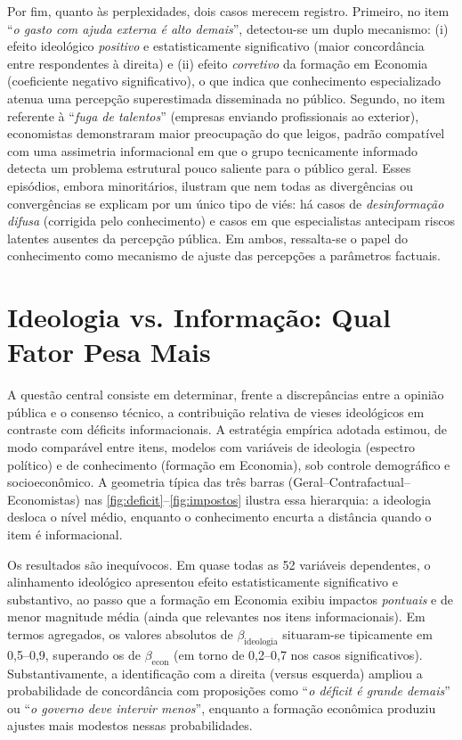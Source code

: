 Por fim, quanto às perplexidades, dois casos merecem registro. Primeiro, no item ``\textit{o gasto com ajuda externa é alto demais}'', detectou-se um duplo mecanismo: (i) efeito ideológico \textit{positivo} e estatisticamente significativo (maior concordância entre respondentes à direita) e (ii) efeito \textit{corretivo} da formação em Economia (coeficiente negativo significativo), o que indica que conhecimento especializado atenua uma percepção superestimada disseminada no público. Segundo, no item referente à ``\textit{fuga de talentos}'' (empresas enviando profissionais ao exterior), economistas demonstraram maior preocupação do que leigos, padrão compatível com uma assimetria informacional em que o grupo tecnicamente informado detecta um problema estrutural pouco saliente para o público geral. Esses episódios, embora minoritários, ilustram que nem todas as divergências ou convergências se explicam por um único tipo de viés: há casos de \textit{desinformação difusa} (corrigida pelo conhecimento) e casos em que especialistas antecipam riscos latentes ausentes da percepção pública. Em ambos, ressalta-se o papel do conhecimento como mecanismo de ajuste das percepções a parâmetros factuais.

\section{Ideologia vs. Informação: Qual Fator Pesa Mais}

A questão central consiste em determinar, frente a discrepâncias entre a opinião pública e o consenso técnico, a contribuição relativa de vieses ideológicos em contraste com déficits informacionais. A estratégia empírica adotada estimou, de modo comparável entre itens, modelos com variáveis de ideologia (espectro político) e de conhecimento (formação em Economia), sob controle demográfico e socioeconômico. A geometria típica das três barras (Geral–Contrafactual–Economistas) nas \autoref{fig:deficit}–\autoref{fig:impostos} ilustra essa hierarquia: a ideologia desloca o nível médio, enquanto o conhecimento encurta a distância quando o item é informacional.

Os resultados são inequívocos. Em quase todas as 52 variáveis dependentes, o alinhamento ideológico apresentou efeito estatisticamente significativo e substantivo, ao passo que a formação em Economia exibiu impactos \textit{pontuais} e de menor magnitude média (ainda que relevantes nos itens informacionais). Em termos agregados, os valores absolutos de $\beta_{\text{ideologia}}$ situaram-se tipicamente em 0{,}5--0{,}9, superando os de $\beta_{\text{econ}}$ (em torno de 0{,}2--0{,}7 nos casos significativos). Substantivamente, a identificação com a direita (versus esquerda) ampliou a probabilidade de concordância com proposições como ``\textit{o déficit é grande demais}'' ou ``\textit{o governo deve intervir menos}'', enquanto a formação econômica produziu ajustes mais modestos nessas probabilidades.

